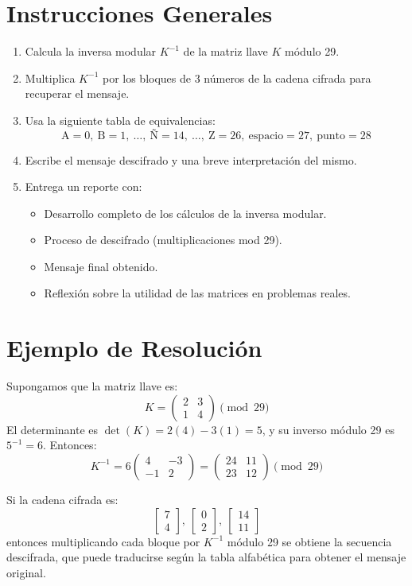 \documentclass[12pt]{article}
\begin{document}
\section*{Instrucciones Generales}
\begin{enumerate}
    \item Calcula la inversa modular $K^{-1}$ de la matriz llave $K$ módulo 29.
    \item Multiplica $K^{-1}$ por los bloques de 3 números de la cadena cifrada para recuperar el mensaje.
    \item Usa la siguiente tabla de equivalencias:
\[
\text{A}=0,\ \text{B}=1,\ \ldots,\ \text{Ñ}=14,\ \ldots,\ \text{Z}=26,\ \text{espacio}=27,\ \text{punto}=28
\]
    \item Escribe el mensaje descifrado y una breve interpretación del mismo.
    \item Entrega un reporte con:
    \begin{itemize}
        \item Desarrollo completo de los cálculos de la inversa modular.
        \item Proceso de descifrado (multiplicaciones mod 29).
        \item Mensaje final obtenido.
        \item Reflexión sobre la utilidad de las matrices en problemas reales.
    \end{itemize}
\end{enumerate}

\section*{Ejemplo de Resolución}
Supongamos que la matriz llave es:
\[
K = \begin{pmatrix} 2 & 3 \\ 1 & 4 \end{pmatrix} \pmod{29}
\]
El determinante es $\det(K) = 2(4) - 3(1) = 5$, y su inverso módulo 29 es $5^{-1} = 6$.
Entonces:
\[
K^{-1} = 6 \begin{pmatrix} 4 & -3 \\ -1 & 2 \end{pmatrix} =
\begin{pmatrix} 24 & 11 \\ 23 & 12 \end{pmatrix} \pmod{29}
\]

Si la cadena cifrada es:
\[
\begin{bmatrix} 7 \\ 4 \end{bmatrix},\ 
\begin{bmatrix} 0 \\ 2 \end{bmatrix},\ 
\begin{bmatrix} 14 \\ 11 \end{bmatrix}
\]
entonces multiplicando cada bloque por $K^{-1}$ módulo 29 se obtiene la secuencia descifrada,
que puede traducirse según la tabla alfabética para obtener el mensaje original.
\end{document}

